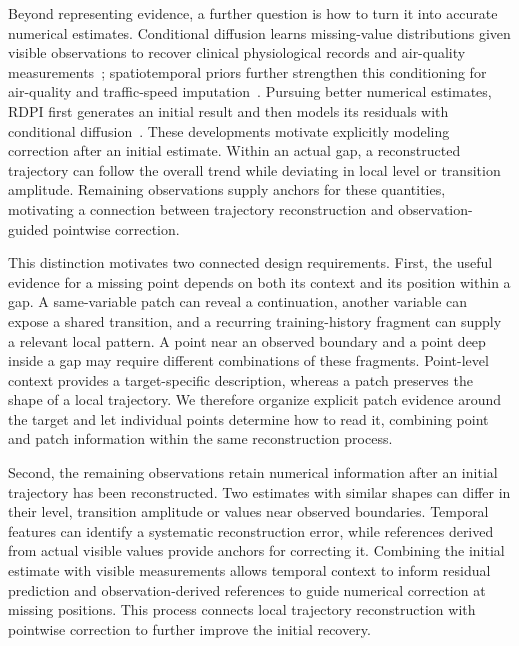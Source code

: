 Beyond representing evidence, a further question is how to turn it into accurate numerical estimates. Conditional diffusion learns missing-value distributions given visible observations to recover clinical physiological records and air-quality measurements~\citep{csdi}; spatiotemporal priors further strengthen this conditioning for air-quality and traffic-speed imputation~\citep{pristi}. Pursuing better numerical estimates, RDPI first generates an initial result and then models its residuals with conditional diffusion~\citep{rdpi}. These developments motivate explicitly modeling correction after an initial estimate. Within an actual gap, a reconstructed trajectory can follow the overall trend while deviating in local level or transition amplitude. Remaining observations supply anchors for these quantities, motivating a connection between trajectory reconstruction and observation-guided pointwise correction.

This distinction motivates two connected design requirements. First, the useful evidence for a missing point depends on both its context and its position within a gap. A same-variable patch can reveal a continuation, another variable can expose a shared transition, and a recurring training-history fragment can supply a relevant local pattern. A point near an observed boundary and a point deep inside a gap may require different combinations of these fragments. Point-level context provides a target-specific description, whereas a patch preserves the shape of a local trajectory. We therefore organize explicit patch evidence around the target and let individual points determine how to read it, combining point and patch information within the same reconstruction process.

Second, the remaining observations retain numerical information after an initial trajectory has been reconstructed. Two estimates with similar shapes can differ in their level, transition amplitude or values near observed boundaries. Temporal features can identify a systematic reconstruction error, while references derived from actual visible values provide anchors for correcting it. Combining the initial estimate with visible measurements allows temporal context to inform residual prediction and observation-derived references to guide numerical correction at missing positions. This process connects local trajectory reconstruction with pointwise correction to further improve the initial recovery.

